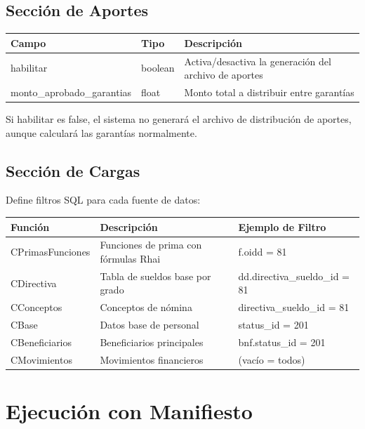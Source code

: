 \subsection{Sección de Aportes}

\begin{center}
\begin{tabular}{llp{8cm}}
\toprule
\textbf{Campo} & \textbf{Tipo} & \textbf{Descripción} \\
\midrule
habilitar & boolean & Activa/desactiva la generación del archivo de aportes \\
monto\_aprobado\_garantias & float & Monto total a distribuir entre garantías \\
\bottomrule
\end{tabular}
\end{center}

Si habilitar es false, el sistema no generará el archivo de distribución de aportes, aunque calculará las garantías normalmente.

\subsection{Sección de Cargas}

Define filtros SQL para cada fuente de datos:

\begin{center}
\begin{tabular}{llp{8cm}}
\toprule
\textbf{Función} & \textbf{Descripción} & \textbf{Ejemplo de Filtro} \\
\midrule
CPrimasFunciones & Funciones de prima con fórmulas Rhai & f.oidd = 81 \\
CDirectiva & Tabla de sueldos base por grado & dd.directiva\_sueldo\_id = 81 \\
CConceptos & Conceptos de nómina & directiva\_sueldo\_id = 81 \\
CBase & Datos base de personal & status\_id = 201 \\
CBeneficiarios & Beneficiarios principales & bnf.status\_id = 201 \\
CMovimientos & Movimientos financieros & (vacío = todos) \\
\bottomrule
\end{tabular}
\end{center}

\section{Ejecución con Manifiesto}

